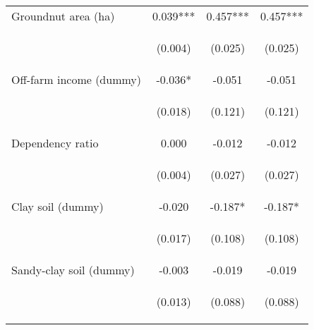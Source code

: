 \begin{center}
\begin{tabular}{lccc}
Groundnut area (ha) & 0.039*** & 0.457*** & 0.457*** \\
\vspace{4pt} & \begin{footnotesize}(0.004)\end{footnotesize} & \begin{footnotesize}(0.025)\end{footnotesize} & \begin{footnotesize}(0.025)\end{footnotesize} \\
Off-farm income (dummy) & -0.036* & -0.051 & -0.051 \\
\vspace{4pt} & \begin{footnotesize}(0.018)\end{footnotesize} & \begin{footnotesize}(0.121)\end{footnotesize} & \begin{footnotesize}(0.121)\end{footnotesize} \\
Dependency ratio & 0.000 & -0.012 & -0.012 \\
\vspace{4pt} & \begin{footnotesize}(0.004)\end{footnotesize} & \begin{footnotesize}(0.027)\end{footnotesize} & \begin{footnotesize}(0.027)\end{footnotesize} \\
Clay soil (dummy) & -0.020 & -0.187* & -0.187* \\
\vspace{4pt} & \begin{footnotesize}(0.017)\end{footnotesize} & \begin{footnotesize}(0.108)\end{footnotesize} & \begin{footnotesize}(0.108)\end{footnotesize} \\
Sandy-clay soil (dummy) & -0.003 & -0.019 & -0.019 \\
\vspace{4pt} & \begin{footnotesize}(0.013)\end{footnotesize} & \begin{footnotesize}(0.088)\end{footnotesize} & \begin{footnotesize}(0.088)\end{footnotesize} \\

\end{tabular}
\end{center}
